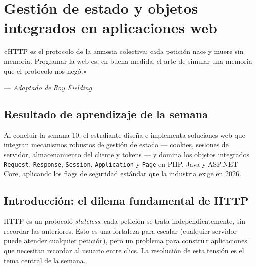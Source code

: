 \documentclass[11pt,a4paper,openany]{book}
\begin{document}
\chapter{Gestión de estado y objetos integrados en aplicaciones web}
\label{cap:semana10}

\epigraph{«HTTP es el protocolo de la amnesia colectiva: cada petición
nace y muere sin memoria. Programar la web es, en buena medida, el arte
de simular una memoria que el protocolo nos negó.»}{--- \textit{Adaptado
de Roy Fielding}}

\section*{Resultado de aprendizaje de la semana}
Al concluir la semana 10, el estudiante diseña e implementa soluciones
web que integran mecanismos robustos de gestión de estado --- cookies,
sesiones de servidor, almacenamiento del cliente y tokens --- y domina
los objetos integrados \texttt{Request}, \texttt{Response},
\texttt{Session}, \texttt{Application} y \texttt{Page} en PHP, Java y
ASP.NET Core, aplicando los flags de seguridad estándar que la
industria exige en 2026.

\section{Introducción: el dilema fundamental de HTTP}

HTTP es un protocolo \emph{stateless}: cada petición se
trata independientemente, sin recordar las anteriores. Esto es una
fortaleza para escalar (cualquier servidor puede atender cualquier
petición), pero un problema para construir aplicaciones que necesitan
recordar al usuario entre clics. La resolución de esta tensión es el
tema central de la semana.
\end{document}
